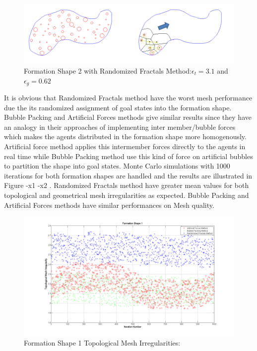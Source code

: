 \begin{figure}[H]
\caption{Formation Shape 2 with Randomized Fractals Method:$\epsilon_t = 3.1$ and $\epsilon_g = 0.62$}
\centerline{\includegraphics[scale = 0.65]{Randomized_Fractals_Mesh_2}}
\end{figure} 	

It is obvious that Randomized Fractals method have the worst mesh performance due the its randomized assignment of goal states into the formation shape. Bubble Packing and Artificial Forces methods give similar results since they have an analogy in their approaches of implementing inter member/bubble forces which makes the agents distributed in the formation shape more homogenously. Artificial force method applies this intermember forces directly to the agents in real time while Bubble Packing method use this kind of force on artificial bubbles to partition the shape into goal states. Monte Carlo simulations with 1000 iterations for both formation shapes are handled and the results are illustrated in Figure -x1 -x2 . Randomized Fractals method have greater mean values for both topological and geometrical mesh irregularities as expected.  Bubble Packing and Artificial Forces methods have similar performances on Mesh quality.
		
\begin{figure}[H]
\caption{Formation Shape 1 Topological Mesh Irregularities:}
\centerline{\includegraphics[scale = 0.45]{Topological_Irr_1}}
\end{figure} 	
		
